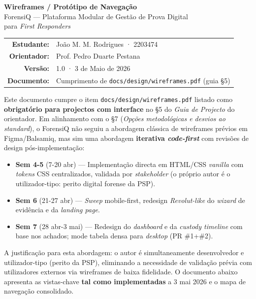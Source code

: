 \documentclass[a4paper,11pt]{article}
\begin{document}
\thispagestyle{empty}
\vspace*{2cm}
\begin{center}
    {\LARGE\bfseries Wireframes / Protótipo de Navegação}\\[0.6em]
    {\large ForensiQ --- Plataforma Modular de Gestão de Prova Digital\\
    para \textit{First Responders}}\\[2cm]

    \begin{tabular}{rl}
        \textbf{Estudante:}   & João M. M. Rodrigues · 2203474 \\
        \textbf{Orientador:}  & Prof. Pedro Duarte Pestana \\
        \textbf{Versão:}      & 1.0 · 3 de Maio de 2026 \\
        \textbf{Documento:}   & Cumprimento de \texttt{docs/design/wireframes.pdf} (guia §5) \\
    \end{tabular}
\end{center}

\vspace{2cm}

\begin{tcolorbox}[colback=forensicblue!5, colframe=forensicblue, title=\textbf{Nota metodológica}]
Este documento cumpre o item \texttt{docs/design/wireframes.pdf} listado como
\textbf{obrigatório para projectos com interface} no §5 do \textit{Guia de Projecto}
do orientador. Em alinhamento com o §7 (\textit{Opções metodológicas e desvios ao standard}),
o ForensiQ não seguiu a abordagem clássica de wireframes prévios em Figma/Balsamiq, mas sim
uma abordagem \textbf{iterativa \textit{code-first}} com revisões de design pós-implementação:

\begin{itemize}[nosep, leftmargin=*]
    \item \textbf{Sem 4-5} (7-20 abr) --- Implementação directa em HTML/CSS \textit{vanilla}
        com \textit{tokens} CSS centralizados, validada por \textit{stakeholder} (o próprio
        autor é o utilizador-tipo: perito digital forense da PSP).
    \item \textbf{Sem 6} (21-27 abr) --- \textit{Sweep} mobile-first, redesign \textit{Revolut-like}
        do \textit{wizard} de evidência e da \textit{landing page}.
    \item \textbf{Sem 7} (28 abr-3 mai) --- Redesign do \textit{dashboard} e da \textit{custody timeline}
        com base nos achados; mode tabela densa para \textit{desktop} (PR \#1+\#2).
\end{itemize}

A justificação para esta abordagem: o autor é simultaneamente desenvolvedor e utilizador-tipo
(perito da PSP), eliminando a necessidade de validação prévia com utilizadores externos via
wireframes de baixa fidelidade. O documento abaixo apresenta as vistas-chave \textbf{tal como
implementadas} a 3 mai 2026 e o mapa de navegação consolidado.
\end{tcolorbox}
\end{document}
